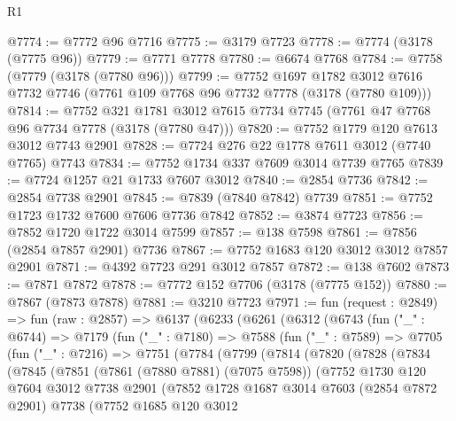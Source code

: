 \begin{lexlean}{R1}
\begin{coremodule}
@7774 := @7772 @96 @7716
@7775 := @3179 @7723
@7778 := @7774 (@3178 (@7775 @96))
@7779 := @7771 @7778
@7780 := @6674 @7768
@7784 := @7758 (@7779 (@3178 (@7780 @96)))
@7799 := @7752
    @1697
    @1782
    @3012
    @7616
    @7732
    @7746
    (@7761 @109 @7768 @96 @7732 @7778 (@3178 (@7780 @109)))
@7814 := @7752
    @321
    @1781
    @3012
    @7615
    @7734
    @7745
    (@7761 @47 @7768 @96 @7734 @7778 (@3178 (@7780 @47)))
@7820 := @7752 @1779 @120 @7613 @3012 @7743 @2901
@7828 := @7724 @276 @22 @1778 @7611 @3012 (@7740 @7765) @7743
@7834 := @7752 @1734 @337 @7609 @3014 @7739 @7765
@7839 := @7724 @1257 @21 @1733 @7607 @3012
@7840 := @2854 @7736
@7842 := @2854 @7738 @2901
@7845 := @7839 (@7840 @7842) @7739
@7851 := @7752 @1723 @1732 @7600 @7606 @7736 @7842
@7852 := @3874 @7723
@7856 := @7852 @1720 @1722 @3014 @7599
@7857 := @138 @7598
@7861 := @7856 (@2854 @7857 @2901) @7736
@7867 := @7752 @1683 @120 @3012 @3012 @7857 @2901
@7871 := @4392 @7723 @291 @3012 @7857
@7872 := @138 @7602
@7873 := @7871 @7872
@7878 := @7772 @152 @7706 (@3178 (@7775 @152))
@7880 := @7867 (@7873 @7878)
@7881 := @3210 @7723
@7971 := fun (request : @2849) =>
  fun (raw : @2857) =>
  @6137
    (@6233
      (@6261
        (@6312
          (@6743
            (fun ("_" : @6744) =>
            @7179
              (fun ("_" : @7180) =>
              @7588
                (fun ("_" : @7589) =>
                @7705
                  (fun ("_" : @7216) =>
                  @7751
                    (@7784
                      (@7799
                        (@7814
                          (@7820
                            (@7828
                              (@7834
                                (@7845
                                  (@7851
                                    (@7861 (@7880 @7881) (@7075 @7598))
                                    (@7752
                                      @1730
                                      @120
                                      @7604
                                      @3012
                                      @7738
                                      @2901
                                      (@7852
                                        @1728
                                        @1687
                                        @3014
                                        @7603
                                        (@2854 @7872 @2901)
                                        @7738
                                        (@7752
                                          @1685
                                          @120
                                          @3012

\end{coremodule}
\end{lexlean}

